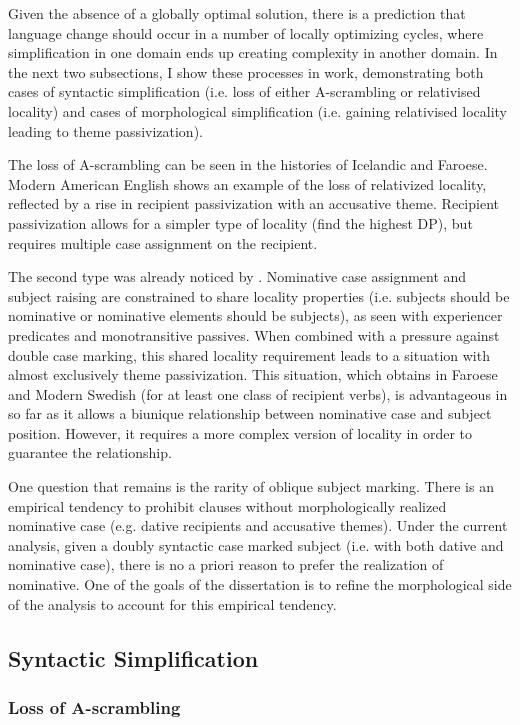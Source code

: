 Given the absence of a globally optimal solution, there is a prediction that language change should occur in a number of locally optimizing cycles, where simplification in one domain ends up creating complexity in another domain. In the next two subsections, I show these processes in work, demonstrating both cases of syntactic simplification (i.e. loss of either A-scrambling or relativised locality) and cases of morphological simplification (i.e. gaining relativised locality leading to theme passivization).

The loss of A-scrambling can be seen in the histories of Icelandic and Faroese. Modern American English shows an example of the loss of relativized locality, reflected by a rise in recipient passivization with an accusative theme. Recipient passivization allows for a simpler type of locality (find the highest DP), but requires multiple case assignment on the recipient.

The second type was already noticed by \cite{Arnadottir.2013}. Nominative case assignment and subject raising are constrained to share locality properties (i.e. subjects should be nominative or nominative elements should be subjects), as seen with experiencer predicates and monotransitive passives. When combined with a pressure against double case marking, this shared locality requirement leads to a situation with almost exclusively theme passivization. This situation, which obtains in Faroese and Modern Swedish (for at least one class of recipient verbs), is advantageous in so far as it allows a biunique relationship between nominative case and subject position. However, it requires a more complex version of locality in order to guarantee the relationship.

One question that remains is the rarity of oblique subject marking. There is an empirical tendency to prohibit clauses without morphologically realized nominative case (e.g. dative recipients and accusative themes). Under the current analysis, given a doubly syntactic case marked subject (i.e. with both dative and nominative case), there is no a priori reason to prefer the realization of nominative. One of the goals of the dissertation is to refine the morphological side of the analysis to account for this empirical tendency.

\subsection{Syntactic Simplification}
\subsubsection{Loss of A-scrambling}




